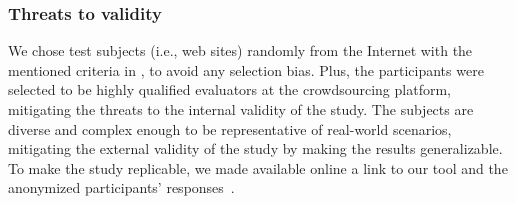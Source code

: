 \subsubsection{Threats to validity}
We chose test subjects (i.e., web sites) randomly from the Internet
with the mentioned criteria in ,
to avoid any selection bias.
Plus, the participants were selected to be highly qualified 
evaluators at the crowdsourcing platform, 
mitigating the threats to the internal validity of the study.
The subjects are diverse and complex enough
to be representative of real-world scenarios,
mitigating the external validity of the study by making the results generalizable.
To make the study replicable, we made available online a link to 
our \toolname tool and the anonymized participants' responses~\cite{tool-and-data}.
